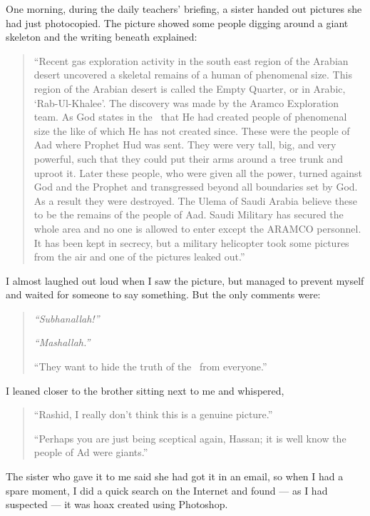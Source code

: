 \documentclass[12pt]{memoir}
\begin{document}
One morning, during the daily teachers’ briefing,
a sister handed out pictures she had just photocopied.
The picture showed some people digging around a giant skeleton
and the writing beneath explained:

\begin{quote}
“Recent gas exploration activity in the south east region of the Arabian desert
uncovered a skeletal remains of a human of phenomenal size.
This region of the Arabian desert is called the Empty Quarter,
or in Arabic, ‘Rab-Ul-Khalee’.
The discovery was made by the Aramco Exploration team.
As God states in the \Quran\ that He had created people of phenomenal size
the like of which He has not created since.
These were the people of Aad where Prophet Hud was sent.
They were very tall, big, and very powerful,
such that they could put their arms around a tree trunk and uproot it.
Later these people, who were given all the power,
turned against God and the Prophet and transgressed
beyond all boundaries set by God.
As a result they were destroyed.
The Ulema of Saudi Arabia believe these to be the remains of the people of Aad.
Saudi Military has secured the whole area and no one is allowed
to enter except the ARAMCO personnel.
It has been kept in secrecy, but a military helicopter took some pictures
from the air and one of the pictures leaked out.”
\end{quote}

I almost laughed out loud when I saw the picture,
but managed to prevent myself and waited for someone to say something.
But the only comments were:

\begin{quote}
\emph{“Subhanallah!”}

\emph{“Mashallah.”}

“They want to hide the truth of the \Quran\ from everyone.”
\end{quote}

I leaned closer to the brother sitting next to me and whispered,

\begin{quote}
“Rashid, I really don’t think this is a genuine picture.”

“Perhaps you are just being sceptical again, Hassan;
it is well know the people of Ad were giants.”
\end{quote}

The sister who gave it to me said she had got it in an email,
so when I had a spare moment, I did a quick search on the Internet and found —
as I had suspected — it was  hoax created using Photoshop.
\end{document}
